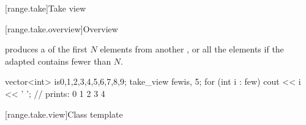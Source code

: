 [range.take]{Take view}

[range.take.overview]{Overview}

\pnum
{} produces a  of the first $N$ elements
from another , or all the elements if the adapted
 contains fewer than $N$.

\pnum
\begin{example}
\begin{codeblock}
vector<int> is{0,1,2,3,4,5,6,7,8,9};
take_view few{is, 5};
for (int i : few)
  cout << i << ' '; // prints: 0 1 2 3 4
\end{codeblock}
\end{example}

[range.take.view]{Class template }

